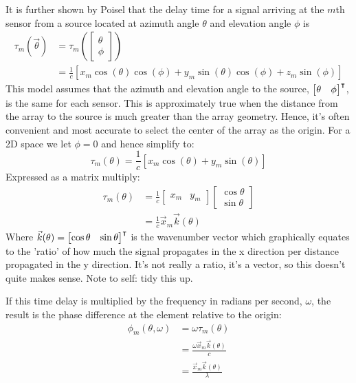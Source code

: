 It is further shown by Poisel that the delay time for a signal arriving at the \(m\)th sensor from a source located at azimuth angle \(\theta\) and elevation angle \(\phi\) is
\begin{align}
 \tau_m(\vec{\theta}) &= \tau_m ( \begin{bmatrix} \theta \\ \phi \end{bmatrix} ) \\
                       &= \frac{1}{c} [ x_m\cos(\theta)\cos(\phi) + y_m\sin(\theta)\cos(\phi) + z_m\sin(\phi) ]
\end{align}
This model assumes that the azimuth and elevation angle to the source, \(\begin{bmatrix}\theta & \phi\end{bmatrix}^\intercal\), is the same for each sensor. This is approximately true when the distance from the array to the source is much greater than the array geometry. Hence, it's often convenient and most accurate to select the center of the array as the origin. 
For a 2D space we let \(\phi = 0\) and hence simplify to:
\begin{equation}
 \tau_m(\theta) = \frac{1}{c} [ x_m\cos(\theta) + y_m\sin(\theta) ]
\end{equation}
Expressed as a matrix multiply:
\begin{align}
\tau_m(\theta) &= \frac{1}{c}\begin{bmatrix}x_m & y_m\end{bmatrix}\begin{bmatrix}\cos\theta\\ \sin\theta\end{bmatrix} \\
          &= \frac{1}{c} \vec{x}_m \vec{k}(\theta)
\end{align}
Where \(\vec{k}(\theta) = \begin{bmatrix}\cos\theta& \sin\theta\end{bmatrix}^\intercal\) is the wavenumber vector which graphically equates to the 'ratio' of how much the signal propagates in the x direction per distance propagated in the y direction. It's not really a ratio, it's a vector, so this doesn't quite makes sense. Note to self: tidy this up.

If this time delay is multiplied by the frequency in radians per second, \(\omega\), the result is the phase difference at the element relative to the origin:
\begin{align}
  \phi_m(\theta, \omega) &= \omega\tau_m(\theta) \\
                         &= \frac{\omega \vec{x}_m \vec{k}(\theta)}{c} \\
                         &= \frac{ \vec{x}_m \vec{k}(\theta) }{\lambda}
\end{align}

